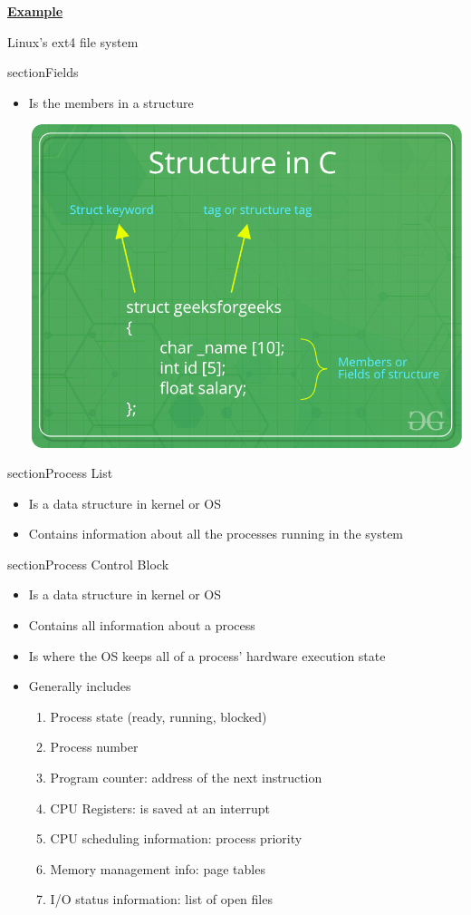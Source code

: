 \documentclass[12pt]{article}
\begin{document}
\bigskip

\underline{\textbf{Example}}

\bigskip

Linux's ext4 file system

\*section{Fields}

\begin{itemize}
    \item Is the members in a structure

    \bigskip

    \begin{center}
    \includegraphics[width=0.6\linewidth]{../images/midterm_2_solution_33.png}
    \end{center}
\end{itemize}

\*section{Process List}

\begin{itemize}
    \item Is a data structure in kernel or OS
    \item Contains information about all the processes running in the system
\end{itemize}

\*section{Process Control Block}

\begin{itemize}
    \item Is a data structure in kernel or OS
    \item Contains all information about a process
    \item Is where the OS keeps all of a process' hardware execution state
    \item Generally includes

    \begin{enumerate}[1.]
        \item Process state (ready, running, blocked)
        \item Process number
        \item Program counter: address of the next instruction
        \item CPU Registers: is saved at an interrupt
        \item CPU scheduling information: process priority
        \item Memory management info: page tables
        \item I/O status information: list of open files
    \end{enumerate}
\end{itemize}
\end{document}
